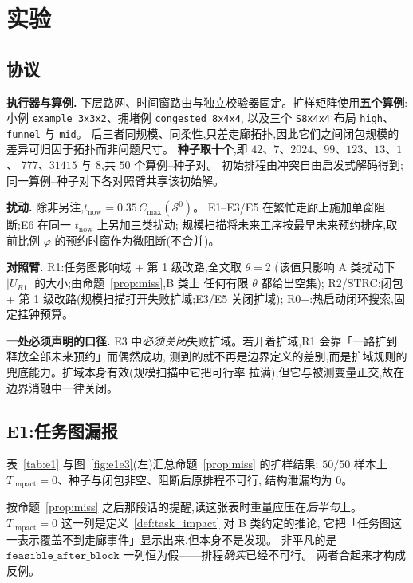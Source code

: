 \documentclass[manuscript,screen,review]{acmart}
\providecommand{\STRC}{\textsc{STRC}}
\newcommand{\NPairs}{50}
\newcommand{\PassMiss}{\NPairs/\NPairs}      %
\begin{document}
\section{实验}
\label{sec:experiments}

\subsection{协议}
\label{sec:protocol}

\textbf{执行器与算例.}
下层路网、时间窗路由与独立校验器固定。扩样矩阵使用\textbf{五个算例}:
小例 \texttt{example\_3x3x2}、拥堵例 \texttt{congested\_8x4x4},
以及三个 \texttt{S8x4x4} 布局 \texttt{high}、\texttt{funnel} 与 \texttt{mid}。
后三者同规模、同柔性,只差走廊拓扑,因此它们之间闭包规模的差异可归因于拓扑而非问题尺寸。
\textbf{种子取十个},即 \(42\)、\(7\)、\(2024\)、\(99\)、\(123\)、\(13\)、\(1\)、
\(777\)、\(31415\) 与 \(8\),共 \(\NPairs\) 个算例--种子对。
初始排程由冲突自由启发式解码得到;同一算例--种子对下各对照臂共享该初始解。

\textbf{扰动.}
除非另注,\(t_{\mathrm{now}}=0.35\,C_{\max}(\mathcal{S}^0)\)。
E1--E3/E5 在繁忙走廊上施加单窗阻断;E6 在同一 \(t_{\mathrm{now}}\) 上另加三类扰动;
规模扫描将未来工序按最早未来预约排序,取前比例 \(\varphi\) 的预约时窗作为微阻断(不合并)。

\textbf{对照臂.}
R1:任务图影响域 + 第 1 级改路,全文取 \(\theta=2\)
(该值只影响 A 类扰动下 \(|U_{R1}|\) 的大小;由命题~\ref{prop:miss},B 类上
任何有限 \(\theta\) 都给出空集);
R2/\STRC:闭包 + 第 1 级改路(规模扫描打开失败扩域;E3/E5 关闭扩域);
R0+:热启动闭环搜索,固定挂钟预算。

\textbf{一处必须声明的口径.}
E3 中\emph{必须关闭}失败扩域。若开着扩域,R1 会靠「一路扩到释放全部未来预约」而偶然成功,
测到的就不再是边界定义的差别,而是扩域规则的兜底能力。扩域本身有效(规模扫描中它把可行率
拉满),但它与被测变量正交,故在边界消融中一律关闭。

\subsection{E1:任务图漏报}
\label{sec:e1}

表~\ref{tab:e1} 与图~\ref{fig:e1e3}(左)汇总命题~\ref{prop:miss} 的扩样结果:
\(\PassMiss\) 样本上 \(T_{\mathrm{impact}}=0\)、种子与闭包非空、阻断后原排程不可行,
结构泄漏均为 \(0\)。

按命题~\ref{prop:miss} 之后那段话的提醒,读这张表时重量应压在\emph{后半句}上。
\(T_{\mathrm{impact}}=0\) 这一列是定义~\ref{def:task_impact} 对 B 类约定的推论,
它把「任务图这一表示覆盖不到走廊事件」显示出来,但本身不是发现。
非平凡的是\(\texttt{feasible\_after\_block}\) 一列恒为假——排程\emph{确实}已经不可行。
两者合起来才构成反例。
\end{document}
